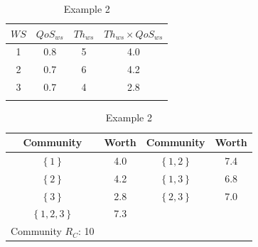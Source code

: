 \documentclass[10pt,journal,cspaper,compsoc]{IEEEtran}
\begin{document}
\begin{table}[!t]
\renewcommand{\arraystretch}{1.3}
\caption{Example 2} \label{example_2} \centering
\begin{tabular}{c c c c}
\hline
$WS$ & $QoS_{ws}$ & $Th_{ws}$ & $Th_{ws} \times QoS_{ws}$\\
\hline
1 & 0.8 & 5 & 4.0\\
2 & 0.7 & 6 & 4.2\\
3 & 0.7 & 4 & 2.8\\
\hline\\
\end{tabular}
%
\renewcommand{\arraystretch}{1.3}
\label{example_2_2} \centering
\begin{tabular}{c c || c c}
\hline
Community & Worth & Community & Worth\\
\hline
$\left\{1\right\}$ & 4.0 & $\left\{1,2\right\}$ & 7.4\\
$\left\{2\right\}$ & 4.2 & $\left\{1,3\right\}$ & 6.8\\
$\left\{3\right\}$ & 2.8 & $\left\{2,3\right\}$ & 7.0\\
$\left\{1,2,3\right\}$ & 7.3\\
\hline
Community $R_C$: 10\\
\hline
\end{tabular}
\end{table}
\end{document}
